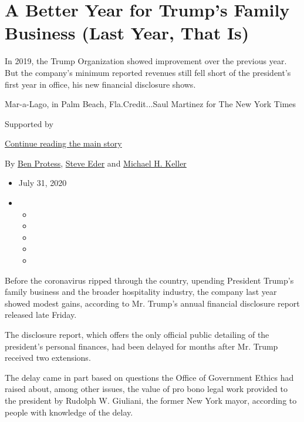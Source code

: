 \hypertarget{a-better-year-for-trumps-family-business-last-year-that-is}{%
\section{A Better Year for Trump's Family Business (Last Year, That
Is)}\label{a-better-year-for-trumps-family-business-last-year-that-is}}

In 2019, the Trump Organization showed improvement over the previous
year. But the company's minimum reported revenues still fell short of
the president's first year in office, his new financial disclosure
shows.

Mar-a-Lago, in Palm Beach, Fla.Credit...Saul Martinez for The New York
Times

Supported by

\protect\hyperlink{after-sponsor}{Continue reading the main story}

By \href{https://www.nytimes3xbfgragh.onion/by/ben-protess}{Ben
Protess}, \href{https://www.nytimes3xbfgragh.onion/by/steve-eder}{Steve
Eder} and
\href{https://www.nytimes3xbfgragh.onion/by/michael-h-keller}{Michael H.
Keller}

\begin{itemize}
\item
  July 31, 2020
\item
  \begin{itemize}
  \item
  \item
  \item
  \item
  \item
  \end{itemize}
\end{itemize}

Before the coronavirus ripped through the country, upending President
Trump's family business and the broader hospitality industry, the
company last year showed modest gains, according to Mr. Trump's annual
financial disclosure report released late Friday.

The disclosure report, which offers the only official public detailing
of the president's personal finances, had been delayed for months after
Mr. Trump received two extensions.

The delay came in part based on questions the Office of Government
Ethics had raised about, among other issues, the value of pro bono legal
work provided to the president by Rudolph W. Giuliani, the former New
York mayor, according to people with knowledge of the delay.

